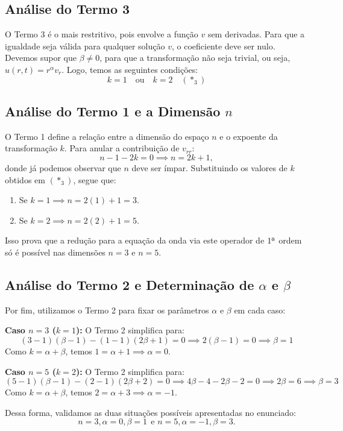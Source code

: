 \documentclass[cs_edp_2026.1.tex]{subfiles} %
\begin{document}
{	\subsection*{Análise do Termo 3}
	O Termo 3 é o mais restritivo, pois envolve a função $v$ sem derivadas. Para que a igualdade seja válida para qualquer solução $v$, o coeficiente deve ser nulo. Devemos supor que $\beta \neq 0$, para que a transformação não seja trivial, ou seja, $u(r, t) = r^\alpha v_r$. Logo, temos as seguintes condições:
	$$ \boxed{k = 1 \quad \text{ou} \quad k = 2 \quad (\ast_3)} $$
	
	\subsection*{Análise do Termo 1 e a Dimensão $n$}
	O Termo 1 define a relação entre a dimensão do espaço $n$ e o expoente da transformação $k$. Para anular a contribuição de $v_{rr}$:
	$$ n - 1 - 2k = 0 \implies n = 2k + 1, $$
	donde já podemos observar que $n$ deve ser ímpar.
	Substituindo os valores de $k$ obtidos em $(\ast_3)$, segue que:
	\begin{enumerate}
		\item Se $k=1 \implies n = 2(1) + 1 = 3$.
		\item Se $k=2 \implies n = 2(2) + 1 = 5$.
	\end{enumerate}
	Isso prova que a redução para a equação da onda via este operador de $\text{1\f}$ ordem só é possível nas dimensões $n=3$ e $n=5$.
	
	\subsection*{Análise do Termo 2 e Determinação de $\alpha$ e $\beta$}
	Por fim, utilizamos o Termo 2 para fixar os parâmetros $\alpha$ e $\beta$ em cada caso:
	
	\textbf{Caso $n=3$ ($k=1$):} O Termo 2 simplifica para:
	$$ (3-1)(\beta-1) - (1-1)(2\beta+1) = 0 \implies 2(\beta-1) = 0 \implies \beta = 1 $$
	Como $k = \alpha + \beta$, temos $1 = \alpha + 1 \implies \alpha = 0$.
	
	\textbf{Caso $n=5$ ($k=2$):} O Termo 2 simplifica para:
	$$ (5-1)(\beta-1) - (2-1)(2\beta+2) = 0 \implies 4\beta - 4 - 2\beta - 2 = 0 \implies 2\beta = 6 \implies \beta = 3 $$
	Como $k = \alpha + \beta$, temos $2 = \alpha + 3 \implies \alpha = -1$.
	
	Dessa forma, validamos as duas situações possíveis apresentadas no enunciado: $$\boxed{n=3, \alpha=0, \beta=1}\ \ \text{e } \boxed{n=5, \alpha=-1, \beta=3}.$$
	
}
\end{document}
